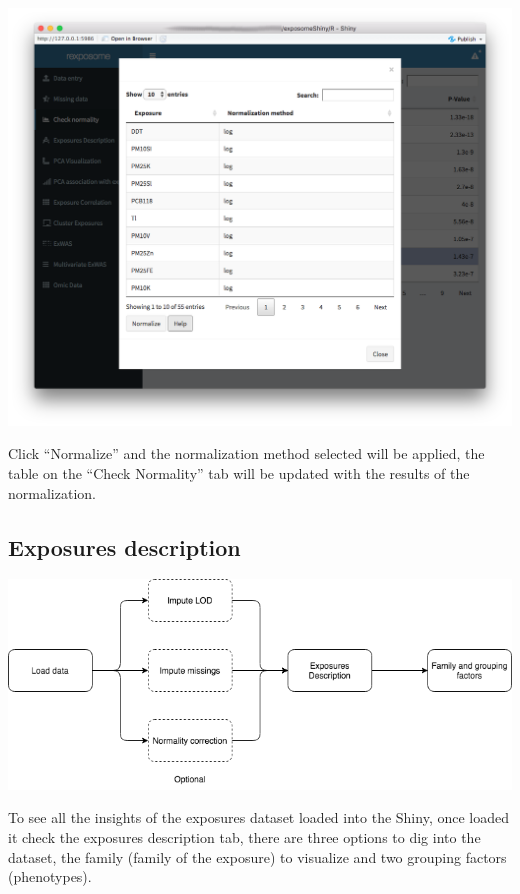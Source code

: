 \documentclass[
]{book}
\begin{document}
\includegraphics{images/analysis3_3.png}

Click ``Normalize'' and the normalization method selected will be applied, the table on the ``Check Normality'' tab will be updated with the results of the normalization.

\hypertarget{exposures-description}{%
\subsection{Exposures description}\label{exposures-description}}

\includegraphics{images/analysis4_1.png}

To see all the insights of the exposures dataset loaded into the Shiny, once loaded it check the exposures description tab, there are three options to dig into the dataset, the family (family of the exposure) to visualize and two grouping factors (phenotypes).
\end{document}

